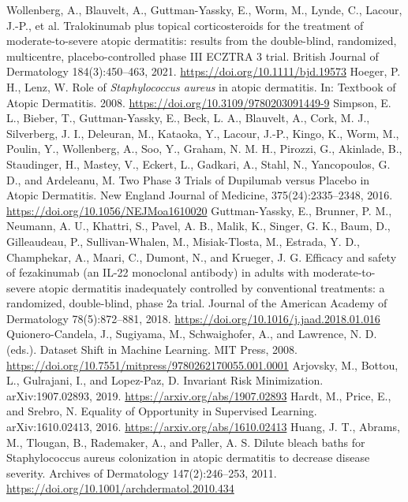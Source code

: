 \begin{thebibliography}{99}
 Wollenberg, A., Blauvelt, A., Guttman-Yassky, E., Worm, M., Lynde, C., Lacour, J.-P., et al. Tralokinumab plus topical corticosteroids for the treatment of moderate-to-severe atopic dermatitis: results from the double-blind, randomized, multicentre, placebo-controlled phase III ECZTRA 3 trial. British Journal of Dermatology 184(3):450--463, 2021. \url{https://doi.org/10.1111/bjd.19573}
 Hoeger, P. H., Lenz, W. Role of \textit{Staphylococcus aureus} in atopic dermatitis. In: Textbook of Atopic Dermatitis. 2008. \url{https://doi.org/10.3109/9780203091449-9}
 Simpson, E. L., Bieber, T., Guttman-Yassky, E., Beck, L. A., Blauvelt, A., Cork, M. J., Silverberg, J. I., Deleuran, M., Kataoka, Y., Lacour, J.-P., Kingo, K., Worm, M., Poulin, Y., Wollenberg, A., Soo, Y., Graham, N. M. H., Pirozzi, G., Akinlade, B., Staudinger, H., Mastey, V., Eckert, L., Gadkari, A., Stahl, N., Yancopoulos, G. D., and Ardeleanu, M. Two Phase 3 Trials of Dupilumab versus Placebo in Atopic Dermatitis. New England Journal of Medicine, 375(24):2335--2348, 2016. \url{https://doi.org/10.1056/NEJMoa1610020}
 Guttman-Yassky, E., Brunner, P. M., Neumann, A. U., Khattri, S., Pavel, A. B., Malik, K., Singer, G. K., Baum, D., Gilleaudeau, P., Sullivan-Whalen, M., Misiak-Tlosta, M., Estrada, Y. D., Champhekar, A., Maari, C., Dumont, N., and Krueger, J. G. Efficacy and safety of fezakinumab (an IL-22 monoclonal antibody) in adults with moderate-to-severe atopic dermatitis inadequately controlled by conventional treatments: a randomized, double-blind, phase 2a trial. Journal of the American Academy of Dermatology 78(5):872--881, 2018. \url{https://doi.org/10.1016/j.jaad.2018.01.016}
 Quionero-Candela, J., Sugiyama, M., Schwaighofer, A., and Lawrence, N. D. (eds.). Dataset Shift in Machine Learning. MIT Press, 2008. \url{https://doi.org/10.7551/mitpress/9780262170055.001.0001}
 Arjovsky, M., Bottou, L., Gulrajani, I., and Lopez-Paz, D. Invariant Risk Minimization. arXiv:1907.02893, 2019. \url{https://arxiv.org/abs/1907.02893}
 Hardt, M., Price, E., and Srebro, N. Equality of Opportunity in Supervised Learning. arXiv:1610.02413, 2016. \url{https://arxiv.org/abs/1610.02413}
 Huang, J. T., Abrams, M., Tlougan, B., Rademaker, A., and Paller, A. S. Dilute bleach baths for Staphylococcus aureus colonization in atopic dermatitis to decrease disease severity. Archives of Dermatology 147(2):246--253, 2011. \url{https://doi.org/10.1001/archdermatol.2010.434}
\end{thebibliography}

